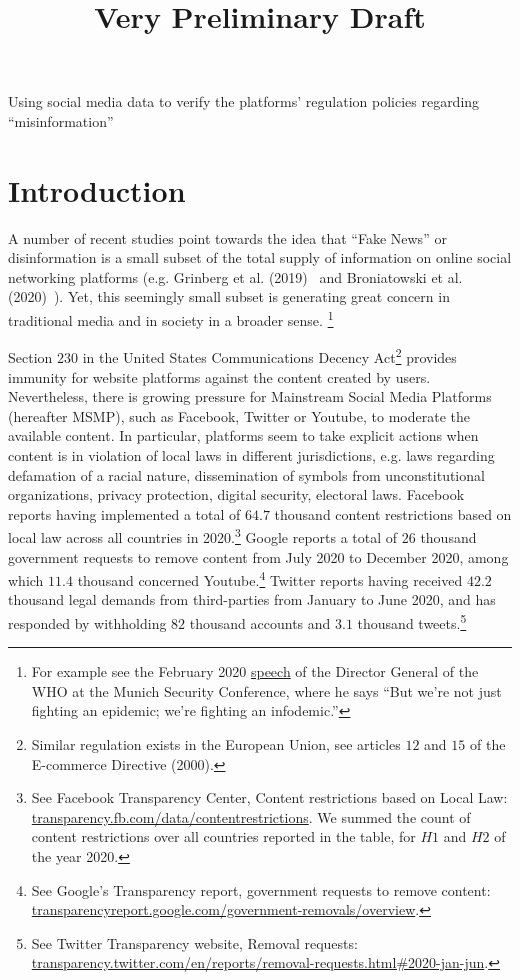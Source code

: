 \documentclass{article}
\begin{document}
\title{Very Preliminary Draft}

\maketitle

Using social media data to verify the platforms' regulation policies regarding ``misinformation''

\section{Introduction}

A number of recent studies  point towards the idea that ``Fake News'' or disinformation is a small subset of the total supply of information on online social networking platforms (e.g. Grinberg et al. (2019)~\cite{grinberg} and Broniatowski et al. (2020)~\cite{broniatowski}). Yet, this seemingly small subset is generating great concern in traditional media and in society in a broader sense. \footnote{For example see the February 2020 \href{https://www.who.int/director-general/speeches/detail/munich-security-conference}{speech} of the Director General of the WHO at the Munich Security Conference, where he says ``But we’re not just fighting an epidemic; we’re fighting an infodemic.''  }

Section $230$ in the United States Communications Decency Act\footnote{Similar regulation exists in the European Union, see articles $12$ and $15$ of the E-commerce Directive (2000). } provides immunity for website platforms against the content created by users. Nevertheless, there is growing pressure for Mainstream Social Media Platforms (hereafter MSMP), such as Facebook, Twitter or Youtube, to moderate the available content. In particular, platforms seem to take explicit actions when content is in violation of local laws in different jurisdictions, e.g. laws regarding defamation of a racial nature, dissemination of symbols from unconstitutional organizations, privacy protection, digital security, electoral laws. Facebook reports having implemented a total of $64.7$ thousand content restrictions based on local law across all countries in 2020.\footnote{See Facebook Transparency Center, Content restrictions based on Local Law: \href{https://transparency.fb.com/data/content\-restrictions}{transparency.fb.com/data/content\-restrictions}. We summed the count of content restrictions over all countries reported in the table, for $H1$ and $H2$ of the year 2020.} Google reports a total of $26$ thousand government requests to remove content from July 2020 to December 2020, among which $11.4$ thousand concerned Youtube.\footnote{See Google's Transparency report, government requests to remove content: \href{https://transparencyreport.google.com/government-removals/overview}{transparencyreport.google.com/government-removals/overview}.} Twitter reports having received $42.2$ thousand legal demands from third-parties from January to June 2020, and has responded by withholding $82$ thousand accounts and $3.1$ thousand tweets.\footnote{See Twitter Transparency website, Removal requests: \href{https://transparency.twitter.com/en/reports/removal-requests.html\#2020-jan-jun}{transparency.twitter.com/en/reports/removal-requests.html\#2020-jan-jun}.} 
\end{document}
